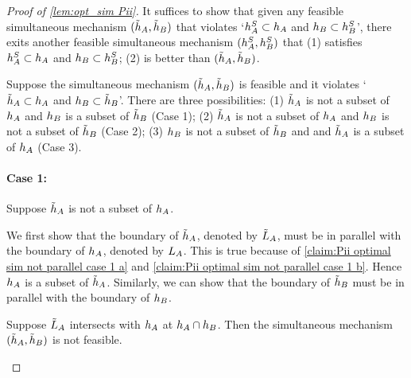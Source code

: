 \begin{proof}[Proof of \cref{lem:opt_sim Pii}]

    It suffices to show that given any feasible simultaneous mechanism $(\tilde{h}_A,\tilde{h}_B)$ that violates `$h_A^S\subset h_A$ and $h_B\subset h_B^S$', there exits another feasible simultaneous mechanism  $(h_A^S,h_B^S)$ that (1) satisfies  $h_A^S\subset h_A$ and $h_B\subset h_B^S$; (2) is better than $(\tilde{h}_A,\tilde{h}_B)$.

    Suppose the simultaneous mechanism $(\tilde{h}_A,\tilde{h}_B)$ is feasible and  it violates `$\tilde{h}_A\subset h_A$ and $h_B\subset\tilde{h}_B$'.
    There are three possibilities: (1) $\tilde{h}_A$ is not a subset of $h_A$ and $h_B$ is a subset of $\tilde{h}_B$ (Case 1); (2) $\tilde{h}_A$ is not a subset of $h_A$ and $h_B$ is not a subset of $\tilde{h}_B$ (Case 2);
    (3) $h_B$ is not a subset of $\tilde{h}_B$ and and $\tilde{h}_A$ is a subset of $h_A$ (Case 3).

    \paragraph{Case 1:} Suppose $\tilde{h}_A$ is not a subset of $h_A$.

    We first show that the boundary of $\tilde{h}_A$, denoted by $\tilde{L}_A$, must be in parallel with the boundary of $h_A$, denoted by $L_A$. 
    This is true because of \cref{claim:Pii optimal sim not parallel case 1 a} and \cref{claim:Pii optimal sim not parallel case 1 b}.
    Hence $h_A$ is a subset of $\tilde{h}_A$.
    Similarly, we can show that the boundary of $\tilde{h}_B$ must be in parallel with the boundary of $h_B$.

    \begin{claim}\label{claim:Pii optimal sim not parallel case 1 a}
        Suppose $\tilde{L}_A$ intersects with $h_A$ at $h_A\cap h_B$. Then the simultaneous mechanism $(\tilde{h}_A,\tilde{h}_B)$ is not feasible.
    \end{claim}


\end{proof}
